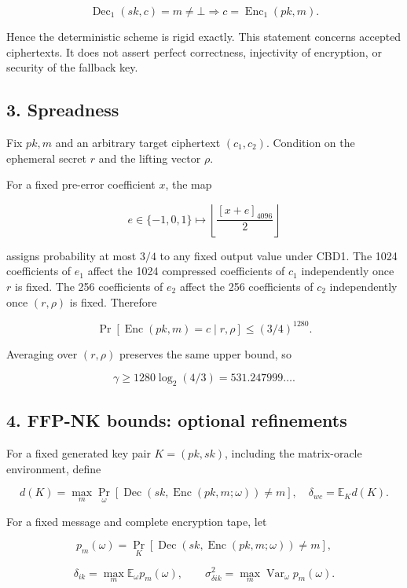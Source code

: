 \documentclass[11pt,a4paper]{article}
\begin{document}
\[
\operatorname{Dec}_1(sk,c)=m\ne\bot
\Longrightarrow
c=\operatorname{Enc}_1(pk,m).
\]

Hence the deterministic scheme is rigid exactly. This statement concerns accepted ciphertexts. It does not assert perfect correctness, injectivity of encryption, or security of the fallback key.

\subsection{3. Spreadness}\label{spreadness}

Fix \(pk,m\) and an arbitrary target ciphertext \((c_1,c_2)\). Condition on the ephemeral secret \(r\) and the lifting vector \(\rho\).

For a fixed pre-error coefficient \(x\), the map

\[
e\in\{-1,0,1\}
\longmapsto
\left\lfloor\frac{[x+e]_{4096}}{2}\right\rfloor
\]

assigns probability at most \(3/4\) to any fixed output value under CBD1. The 1024 coefficients of \(e_1\) affect the 1024 compressed coefficients of \(c_1\) independently once \(r\) is fixed. The 256 coefficients of \(e_2\) affect the 256 coefficients of \(c_2\) independently once \((r,\rho)\) is fixed. Therefore

\[
\Pr[\operatorname{Enc}(pk,m)=c\mid r,\rho]
\le(3/4)^{1280}.
\]

Averaging over \((r,\rho)\) preserves the same upper bound, so

\[
\boxed{\gamma\ge1280\log_2(4/3)=531.247999\ldots.}
\]

\subsection{4. FFP-NK bounds: optional refinements}\label{ffp-nk-bounds-optional-refinements}

For a fixed generated key pair \(K=(pk,sk)\), including the matrix-oracle environment, define

\[
d(K)=\max_m\Pr_\omega[\operatorname{Dec}(sk,\operatorname{Enc}(pk,m;\omega))\ne m],
\quad \delta_{wc}=\mathbb E_K d(K).
\]

For a fixed message and complete encryption tape, let

\[
p_m(\omega)=\Pr_K[\operatorname{Dec}(sk,\operatorname{Enc}(pk,m;\omega))\ne m],
\]

\[
\delta_{ik}=\max_m\mathbb E_\omega p_m(\omega),\qquad
\sigma_{\delta ik}^2=\max_m\operatorname{Var}_\omega p_m(\omega).
\]
\end{document}
